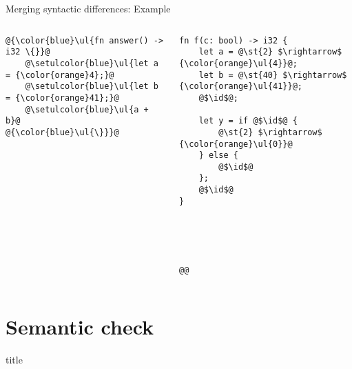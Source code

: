 \documentclass{beamer}
\makeatletter
\let\UL\ul
\renewcommand\ul{%
  \let\set@color\beamerorig@set@color
  \let\reset@color\beamerorig@reset@color
  \UL}
\let\ST\st
\renewcommand\st{%
  \let\set@color\beamerorig@set@color
  \let\reset@color\beamerorig@reset@color
  \ST}
\newcommand\id{\square}
\newcommand{\sectiontitleframe}{
    \begin{frame}
        \vfill
        \centering
        \begin{beamercolorbox}[sep=8pt,center,shadow=true,rounded=true]{title}
            \usebeamerfont{title}\insertsectionhead\par%
        \end{beamercolorbox}
        \vfill
\end{frame}}
\makeatother
\begin{document}
\begin{frame}[fragile]{Merging syntactic differences: Example}
\begin{columns}
\begin{column}{0.33\textwidth}
\begin{onlyenv}
\begin{lstlisting}
@{\color{blue}\ul{fn answer() -> i32 \{}}@
    @\setulcolor{blue}\ul{let a = {\color{orange}4};}@
    @\setulcolor{blue}\ul{let b = {\color{orange}41};}@
    @\setulcolor{blue}\ul{a + b}@
@{\color{blue}\ul{\}}}@
\end{lstlisting}
\end{onlyenv}
\end{column}
\begin{column}{.33\textwidth}
\vspace{0.5em}
\begin{lstlisting}[rulecolor=\color{orange!30}]
fn f(c: bool) -> i32 {
    let a = @\st{2} $\rightarrow$ {\color{orange}\ul{4}}@;
    let b = @\st{40} $\rightarrow$ {\color{orange}\ul{41}}@;
    @$\id$@;

    let y = if @$\id$@ {
        @\st{2} $\rightarrow$ {\color{orange}\ul{0}}@
    } else {
        @$\id$@
    };
    @$\id$@
}





@@
\end{lstlisting}
\end{column}
\end{columns}
\end{frame}

\section{Semantic check}
\sectiontitleframe
\end{document}
